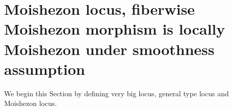 \documentclass[11pt]{article}
\theoremstyle{definition}
\begin{document}
	
	\section{Moishezon locus, fiberwise Moishezon morphism is locally Moishezon under smoothness assumption}
	
	We begin this Section by defining very big locus, general type locus and Moishezon locus. 

	\printbibliography	
	
\end{document}

